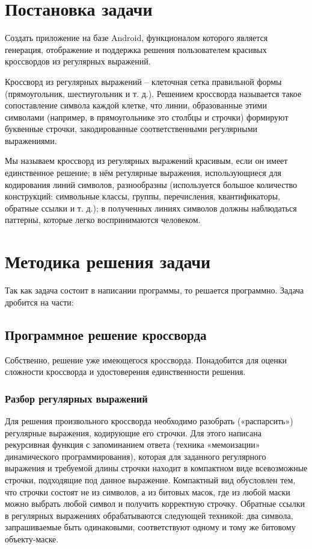 \documentclass[12pt]{report}
\begin{document}
    \newpage %
   \chapter{Постановка задачи}
   
   Создать приложение на базе Android, функционалом которого является генерация, отображение и поддержка решения пользователем красивых кроссвордов из регулярных выражений.
   
   Кроссворд из регулярных выражений -- клеточная сетка правильной формы (прямоугольник, шестиугольник и т. д.). Решением кроссворда называется такое сопоставление символа каждой клетке, что линии, образованные этими символами (например, в прямоугольнике это столбцы и строчки) формируют буквенные строчки, закодированные соответственными регулярными выражениями.
   
   Мы называем кроссворд из регулярных выражений красивым, если он имеет единственное решение; в нём регулярные выражения, использующиеся для кодирования линий символов, разнообразны (используется большое количество конструкций: символьные классы, группы, перечисления, квантификаторы, обратные ссылки и т. д.); в полученных линиях символов должны наблюдаться паттерны, которые легко воспринимаются человеком.


    \newpage %
\chapter{Методика решения задачи}

Так как задача состоит в написании программы, то решается программно. Задача дробится на части: 
\section{Программное решение кроссворда}
Собственно, решение уже имеющегося кроссворда. Понадобится для оценки сложности кроссворда и удостоверения единственности решения.

\subsection{Разбор регулярных выражений} Для решения произвольного кроссворда необходимо разобрать («распарсить») регулярные выражения, кодирующие его строчки. Для этого написана рекурсивная функция с запоминанием ответа (техника «мемоизации» динамического программирования), которая для заданного регулярного выражения и требуемой длины строчки находит в компактном виде всевозможные строчки, подходящие под данное выражение. Компактный вид обусловлен тем, что строчки состоят не из символов, а из битовых масок, где из любой маски можно выбрать любой символ и получить корректную строчку. Обратные ссылки в регулярных выражениях обрабатываются следующей техникой: два символа, запрашиваемые быть одинаковыми, соответствуют одному и тому же битовому объекту-маске.
\end{document}
